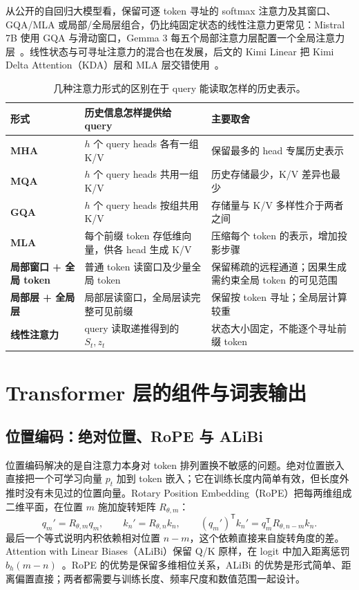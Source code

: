 从公开的自回归大模型看，保留可逐 token 寻址的 softmax 注意力及其窗口、GQA/MLA 或局部/全局层组合，仍比纯固定状态的线性注意力更常见：Mistral 7B 使用 GQA 与滑动窗口，Gemma 3 每五个局部注意力层配置一个全局注意力层~\cite{jiang2023mistral,gemmateam2025gemma3}。线性状态与可寻址注意力的混合也在发展，后文的 Kimi Linear 把 Kimi Delta Attention（KDA）层和 MLA 层交错使用~\cite{kimilinear}。

\begin{table}[H]
\centering\small
\begin{tabularx}{\textwidth}{>{\bfseries}p{28mm} X X}
\toprule
形式 & 历史信息怎样提供给 query & 主要取舍\\
\midrule
MHA & \(h\) 个 query heads 各有一组 K/V & 保留最多的 head 专属历史表示\\
MQA & \(h\) 个 query heads 共用一组 K/V & 历史存储最少，K/V 差异也最少\\
GQA & \(h\) 个 query heads 按组共用 K/V & 存储量与 K/V 多样性介于两者之间\\
MLA & 每个前缀 token 存低维向量，供各 head 生成 K/V & 压缩每个 token 的表示，增加投影步骤\\
局部窗口 + 全局 token & 普通 token 读窗口及少量全局 token & 保留稀疏的远程通道；因果生成需约束全局 token 的可见范围\\
局部层 + 全局层 & 局部层读窗口，全局层读完整可见前缀 & 保留按 token 寻址；全局层计算较重\\
线性注意力 & query 读取递推得到的 \(S_t,z_t\) & 状态大小固定，不能逐个寻址前缀 token\\
\bottomrule
\end{tabularx}
\caption{几种注意力形式的区别在于 query 能读取怎样的历史表示。}
\label{tab:attention-variants}
\end{table}

\section{Transformer 层的组件与词表输出}

\subsection{位置编码：绝对位置、RoPE 与 ALiBi}
\label{sec:rope}

位置编码解决的是自注意力本身对 token 排列置换不敏感的问题。绝对位置嵌入直接把一个可学习向量 \(p_t\) 加到 token 嵌入；它在训练长度内简单有效，但长度外推时没有未见过的位置向量。Rotary Position Embedding（RoPE）把每两维组成二维平面，在位置 \(m\) 施加旋转矩阵 \(R_{\theta,m}\)：
\begin{equation}
 q_m'=R_{\theta,m}q_m,\qquad k_n'=R_{\theta,n}k_n,\qquad
 (q_m')^\mathsf T k_n'
 =q_m^\mathsf T R_{\theta,n-m}k_n.
\end{equation}
最后一个等式说明内积依赖相对位置 \(n-m\)，这个依赖直接来自旋转角度的差。Attention with Linear Biases（ALiBi）保留 Q/K 原样，在 logit 中加入距离惩罚 \(b_h(m-n)\)~\cite{su2021rope,press2022alibi}。RoPE 的优势是保留多维相位关系，ALiBi 的优势是形式简单、距离偏置直接；两者都需要与训练长度、频率尺度和数值范围一起设计。

